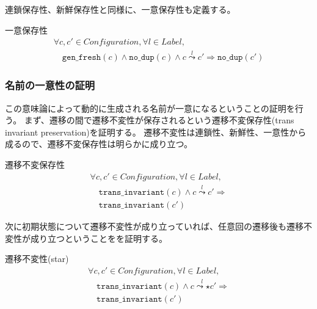 連鎖保存性、新鮮保存性と同様に、一意保存性も定義する。

\begin{lemma}{一意保存性}
\begin{displaymath}
  \begin{array}{l}
    \forall c, c' \in \textit{Configuration}, \forall l \in \textit{Label}, \\
    \quad \texttt{gen\_fresh}(c) \wedge \texttt{no\_dup}(c) \wedge c \overset{l}{\leadsto} c' \Rightarrow \texttt{no\_dup}(c')
  \end{array}
\end{displaymath}
\end{lemma}

\subsubsection{名前の一意性の証明}

この意味論によって動的に生成される名前が一意になるということの証明を行う。
まず、遷移の間で遷移不変性が保存されるという遷移不変保存性(trans invariant preservation)を証明する。
遷移不変性は連鎖性、新鮮性、一意性から成るので、遷移不変保存性は明らかに成り立つ。

\begin{lemma}{遷移不変保存性}
  \begin{displaymath}
    \begin{array}{l}
      \forall c, c' \in \textit{Configuration}, \forall l \in \textit{Label}, \\
      \quad \texttt{trans\_invariant}(c) \wedge c \overset{l}{\leadsto} c' \Rightarrow \\
      \quad \texttt{trans\_invariant}(c')
    \end{array}
  \end{displaymath}
\end{lemma}

次に初期状態について遷移不変性が成り立っていれば、任意回の遷移後も遷移不変性が成り立つということをを証明する。

\begin{lemma}{遷移不変性(star)}
  \begin{displaymath}
    \begin{array}{l}
      \forall c, c' \in \textit{Configuration}, \forall l \in \textit{Label}, \\
      \quad \texttt{trans\_invariant}(c) \wedge c \overset{l}{\leadsto\star} c' \Rightarrow \\
      \quad \texttt{trans\_invariant}(c')
    \end{array}
  \end{displaymath}
\end{lemma}

